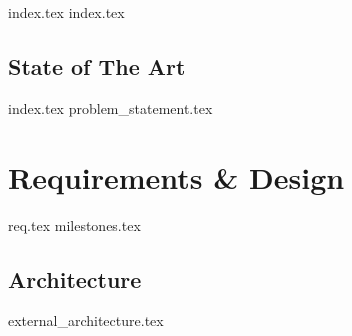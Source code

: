 {index.tex}
{index.tex}
\chapter{State of The Art}\label{cha:sota}
{index.tex}
{problem_statement.tex}
\part{Requirements \& Design}
{req.tex}
{milestones.tex}
\chapter{Architecture}
{external_architecture.tex}
